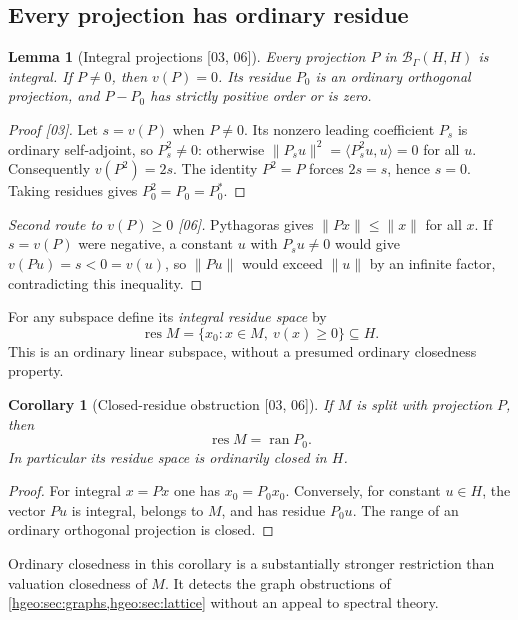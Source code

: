 \documentclass[11pt,letterpaper]{article}
\numberwithin{equation}{section}
\newtheorem{lemma}[lemma]{Lemma}
\newtheorem{corollary}[corollary]{Corollary}
\theoremstyle{definition}
\theoremstyle{remark}
\newcommand{\BH}{\mathscr B_\Gamma(H,H)}
\newcommand{\ran}{\operatorname{ran}}
\newcommand{\res}{\operatorname{res}}
\newcommand{\ip}[2]{\langle #1,#2\rangle}
\newcommand{\norm}[1]{\lVert #1\rVert}
\newcommand{\src}[1]{\textup{\textsf{\small[#1]}}}
\begin{document}
\subsection{Every projection has ordinary residue}

\begin{lemma}[Integral projections \src{03, 06}]\label{hgeo:lem:integralproj}
Every projection $P$ in $\BH$ is integral. If $P\ne0$,
then $v(P)=0$. Its residue $P_0$ is an ordinary orthogonal projection,
and $P-P_0$ has strictly positive order or is zero.
\end{lemma}
\begin{proof}[Proof \src{03}]
Let $s=v(P)$ when $P\ne0$. Its nonzero leading coefficient $P_s$ is
ordinary self-adjoint, so $P_s^2\ne0$: otherwise
$\norm{P_su}^2=\ip{P_s^2u}{u}=0$ for all $u$.
Consequently $v(P^2)=2s$. The identity $P^2=P$ forces $2s=s$, hence
$s=0$. Taking residues gives $P_0^2=P_0=P_0^*$.
\end{proof}
\begin{proof}[Second route to $v(P)\ge0$ \src{06}]
Pythagoras gives $\norm{Px}\le\norm{x}$ for all $x$. If $s=v(P)$ were
negative, a constant $u$ with $P_su\ne0$ would give $v(Pu)=s<0=v(u)$, so
$\norm{Pu}$ would exceed $\norm u$ by an infinite factor, contradicting this
inequality.
\end{proof}

For any subspace define its \emph{integral residue space} by
\begin{equation}\label{hgeo:eq:residue}
 \res M=\{x_0:x\in M,\ v(x)\ge0\}\subseteq H.
\end{equation}
This is an ordinary linear subspace, without a presumed ordinary closedness
property.

\begin{corollary}[Closed-residue obstruction \src{03, 06}]\label{hgeo:cor:residue}
If $M$ is split with projection $P$, then
\[
 \res M=\ran P_0.
\]
In particular its residue space is ordinarily closed in $H$.
\end{corollary}
\begin{proof}
For integral $x=Px$ one has $x_0=P_0x_0$. Conversely, for constant
$u\in H$, the vector $Pu$ is integral, belongs to $M$, and has residue
$P_0u$. The range of an ordinary orthogonal projection is closed.
\end{proof}

Ordinary closedness in this corollary is a substantially stronger
restriction than valuation closedness of $M$. It detects the
graph obstructions of \cref{hgeo:sec:graphs,hgeo:sec:lattice} without an
appeal to spectral theory.
\end{document}
